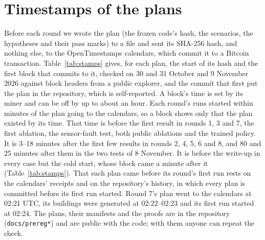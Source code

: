 \documentclass{article}
\begin{document}
\section{Timestamps of the plans}\label{app:stamps}
Before each round we wrote the plan (the frozen code's hash, the scenarios, the hypotheses and their pass marks) to a
file and sent its SHA-256 hash, and nothing else, to the OpenTimestamps calendars, which commit it to a Bitcoin
transaction. Table~\ref{tab:stamps} gives, for each plan, the start of its hash and the first block that commits to
it, checked on 30 and 31 October and 9 November 2026 against block headers from a public explorer, and the commit that first put the plan in the repository, which is self-reported. A block's time is set by its
miner and can be off by up to about an hour. Each round's runs started within minutes of the plan going to the
calendars, so a block shows only that the plan existed by its time. That time is before the first result in rounds 1,
3 and 7, the first ablation, the sensor-fault test, both public ablations and the trained policy. It is 3--18 minutes
after the first few results in rounds 2, 4, 5, 6 and 8, and 80 and 25 minutes after them in the two tests of 8
November. It is before the write-up in every case but the cold start, whose block came a minute after it
(Table~\ref{tab:stamps}). That each plan came before its round's first run
rests on the calendars' receipts and on the repository's history, in which every plan is committed before its first
run started. Round 7's plan went to the calendars at 02:21 UTC, its buildings were generated at 02:22--02:23 and its
first run started at 02:24. The plans, their manifests and the proofs are in the repository (\texttt{docs/prereg*})
and are public with the code; with them anyone can repeat the check.
\end{document}
